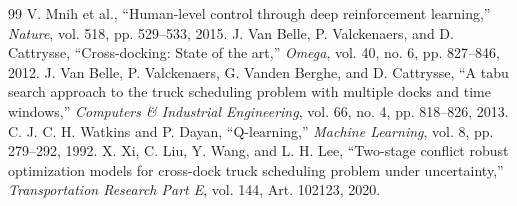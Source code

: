 \documentclass[11pt,a4paper]{article}
\begin{document}
\begin{thebibliography}{99}
 V. Mnih et al., ``Human-level control through deep reinforcement learning,'' \emph{Nature}, vol. 518, pp. 529--533, 2015.
 J. Van Belle, P. Valckenaers, and D. Cattrysse, ``Cross-docking: State of the art,'' \emph{Omega}, vol. 40, no. 6, pp. 827--846, 2012.
 J. Van Belle, P. Valckenaers, G. Vanden Berghe, and D. Cattrysse, ``A tabu search approach to the truck scheduling problem with multiple docks and time windows,'' \emph{Computers \& Industrial Engineering}, vol. 66, no. 4, pp. 818--826, 2013.
 C. J. C. H. Watkins and P. Dayan, ``Q-learning,'' \emph{Machine Learning}, vol. 8, pp. 279--292, 1992.
 X. Xi, C. Liu, Y. Wang, and L. H. Lee, ``Two-stage conflict robust optimization models for cross-dock truck scheduling problem under uncertainty,'' \emph{Transportation Research Part E}, vol. 144, Art. 102123, 2020.
\end{thebibliography}
\end{document}
